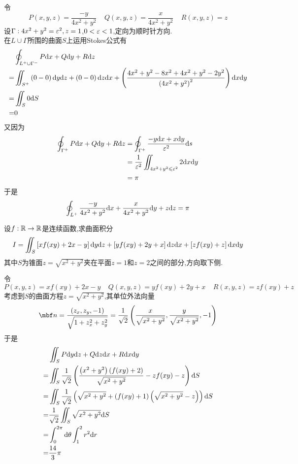 \documentclass{ctexart}
\begin{document}
\begin{solution}
    令
    \[P(x,y,z)=\dfrac{-y}{4x^2+y^2}\ \ \ \ \ Q(x,y,z)=\dfrac{x}{4x^2+y^2}\ \ \ \ \ R(x,y,z)=z\]
    设$\Gamma:4x^2+y^2=\varepsilon^2,z=1$,$0<\varepsilon<1$,定向为顺时针方向.\\
    在$L\cup\Gamma$所围的曲面$S$上运用Stokes公式有
    \[\begin{aligned}
        &\oint_{L^+\cup\Gamma^-}P\mathrm{d} x+Q\mathrm{d} y+R\mathrm{d} z\\
        =&\iint_{S^+}\left(0-0\right)\mathrm{d} y\mathrm{d} z+\left(0-0\right)\mathrm{d} z\mathrm{d} x+\left(\dfrac{4x^2+y^2-8x^2+4x^2+y^2-2y^2}{\left(4x^2+y^2\right)^2}\right)\mathrm{d} x\mathrm{d} y \\
        =&\iint_{S}0\mathrm{d} S \\
        =&0
    \end{aligned}\]
    又因为
    \[\begin{aligned}
        \oint_{\Gamma^+}P\mathrm{d} x+Q\mathrm{d} y+R\mathrm{d} z
        &= \oint_{\Gamma^+}\dfrac{-y\mathrm{d} x+x\mathrm{d} y}{\varepsilon^2}\mathrm{d} s \\
        &= \dfrac{1}{\varepsilon^2}\iint_{4x^2+y^2\leqslant\varepsilon^2}2\mathrm{d} x\mathrm{d} y \\
        &= \pi
    \end{aligned}\]
    于是
    \[\oint_{L^+}\dfrac{-y}{4x^2+y^2}\mathrm{d} x+\dfrac{x}{4x^2+y^2}\mathrm{d} y+z\mathrm{d} z=\pi\]

\end{solution}
\begin{problem}[3.(20\songti{分})]
    设$f:\mathbb{R}\to\mathbb{R}$是连续函数,求曲面积分
    \[I=\iint_S\left[xf(xy)+2x-y\right]\mathrm{d} y\mathrm{d} z+\left[yf(xy)+2y+x\right]\mathrm{d} z\mathrm{d} x+\left[zf(xy)+z\right]\mathrm{d} x\mathrm{d} y\]
    其中$S$为锥面$z=\sqrt{x^2+y^2}$夹在平面$z=1$和$z=2$之间的部分,方向取下侧.
\end{problem}
\begin{solution}
    令
    \[P(x,y,z)=xf(xy)+2x-y\ \ \ \ \ Q(x,y,z)=yf(xy)+2y+x\ \ \ \ \ R(x,y,z)=zf(xy)+z\]
    考虑到$S$的曲面方程$z=\sqrt{x^2+y^2}$,其单位外法向量
    \[\mbf n=\dfrac{\left(z_x,z_y,-1\right)}{\sqrt{1+z_x^2+z_y^2}}
    =\dfrac{1}{\sqrt2}\left(\dfrac{x}{\sqrt{x^2+y^2}},\dfrac{y}{\sqrt{x^2+y^2}},-1\right)\]
    于是
    \[\begin{aligned}
        &\iint_{S}P\mathrm{d} y\mathrm{d} z+Q\mathrm{d} z\mathrm{d} x+R\mathrm{d} x\mathrm{d} y\\
        =&\iint_{S}\dfrac{1}{\sqrt2}\left(\dfrac{\left(x^2+y^2\right)\left(f(xy)+2\right)}{\sqrt{x^2+y^2}}-zf(xy)-z\right)\mathrm{d} S \\
        =&\iint_{S}\dfrac{1}{\sqrt2}\left(\sqrt{x^2+y^2}+\left(f(xy)+1\right)\left(\sqrt{x^2+y^2}-z\right)\right)\mathrm{d} S \\
        =&\dfrac{1}{\sqrt2}\iint_{S}\sqrt{x^2+y^2}\mathrm{d} S \\
        =&\int_0^{2\pi}\mathrm{d}\theta\int_1^2r^2\mathrm{d} r \\
        =&\dfrac{14}{3}\pi
    \end{aligned}\]
\end{solution}
\end{document}
